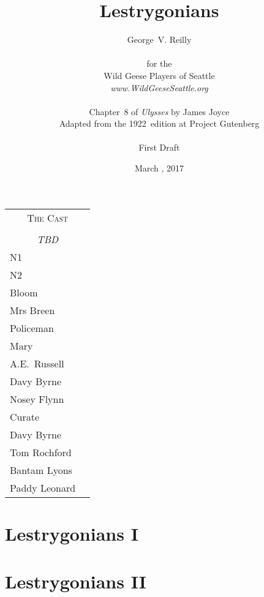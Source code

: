 


\title{\Huge Lestrygonians}
\author{George~V. Reilly\\
\\
{\small for the}\\
Wild Geese Players of Seattle\\
{\emph{www.WildGeeseSeattle.org}}\\
\\
{\small Chapter~8 of \emph{Ulysses} by James Joyce}\\
{\small Adapted from the 1922~edition at Project Gutenberg}
\\
\\
{\small First Draft}}
\date{March , 2017}
\raggedbottom



\maketitle
\thispagestyle{empty}
\pagebreak

\begin{tabular}{lp{10cm}}
    \multicolumn{2}{c}{\Large \textsc{The Cast}} \\
\\
    \multicolumn{2}{c}{\large \textit{TBD}} \\
N1 \\
N2 \\
Bloom \\
Mrs Breen \\
Policeman \\
Mary \\
A.E.~Russell \\
Davy Byrne \\
Nosey Flynn \\
Curate \\
Davy Byrne \\
Tom Rochford \\
Bantam Lyons \\
Paddy Leonard \\
\end{tabular}

\thispagestyle{empty}
\newpage


\setcounter{page}{1}

\section*{Lestrygonians I}


\section*{Lestrygonians II}



